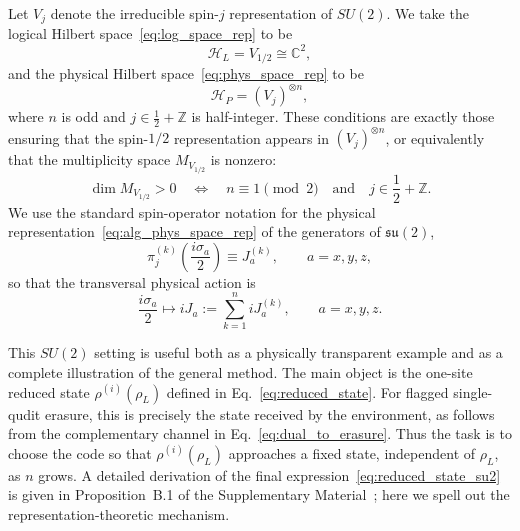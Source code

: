 \documentclass[10pt,twocolumn,superscriptaddress,aps,amsmath,amssymb,citeautoscript,floatfix,prx,longbibliography]{revtex4-2}
\newcounter{alg}
\theoremstyle{plain}
\theoremstyle{plain}
\theoremstyle{plain}
\theoremstyle{plain}
\theoremstyle{plain}
\theoremstyle{plain}
\begin{document}
Let $V_j$ denote the irreducible spin-$j$ representation of $SU(2)$. We take the logical Hilbert space~\eqref{eq:log_space_rep} to be
\[
    \mathcal H_L = V_{1/2}\cong \mathbb C^2,
\]
and the physical Hilbert space~\eqref{eq:phys_space_rep} to be
\[
    \mathcal H_P = (V_j)^{\otimes n},
\]
where $n$ is odd and $j\in \frac12+\mathbb Z$ is half-integer. These conditions are exactly those ensuring that the spin-$1/2$ representation appears in $(V_j)^{\otimes n}$, or equivalently that the multiplicity space $M_{V_{1/2}}$ is nonzero:
\[
    \dim M_{V_{1/2}}>0
    \quad\Longleftrightarrow\quad
    n\equiv 1 \pmod 2
    \quad\text{and}\quad
    j\in \frac12+\mathbb Z .
\]
We use the standard spin-operator notation for the physical representation~\eqref{eq:alg_phys_space_rep} of the generators of $\mathfrak{su}(2)$,
\[
    \pi_j^{(k)}\left(\frac{i\sigma_a}{2}\right)
    \equiv J_a^{(k)},
    \qquad a=x,y,z,
\]
so that the transversal physical action is
\begin{equation}\label{eq:su2_cov_rep}
    \frac{i\sigma_a}{2}
    \longmapsto
    iJ_a
    :=
    \sum_{k=1}^n iJ_a^{(k)},
    \qquad a=x,y,z .
\end{equation}

This $SU(2)$ setting is useful both as a physically transparent example and as a complete illustration of the general method. The main object is the one-site reduced state $\rho^{(i)}(\rho_L)$ defined in Eq.~\eqref{eq:reduced_state}. For flagged single-qudit erasure, this is precisely the state received by the environment, as follows from the complementary channel in Eq.~\eqref{eq:dual_to_erasure}. Thus the task is to choose the code so that $\rho^{(i)}(\rho_L)$ approaches a fixed state, independent of $\rho_L$, as $n$ grows. A detailed derivation of the final expression~\eqref{eq:reduced_state_su2} is given in Proposition~B.1 of the Supplementary Material~\cite{SuppMat}; here we spell out the representation-theoretic mechanism.

\end{document}
